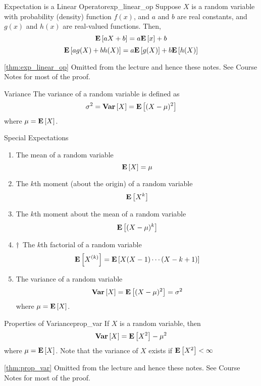 \begin{Theorem}{Expectation is a Linear Operator}{exp_linear_op}
    Suppose $ X $ is a random variable with probability (density)
    function $ f(x) $, and $ a $ and $ b $ are real constants,
    and $ g(x) $ and $ h(x) $ are real-valued functions. Then,
    \[ \bm{\mathrm{E}}\left[aX+b\right]=a\bm{\mathrm{E}}\left[x\right]+b \]
    \[ \bm{\mathrm{E}}\left[a g(X)+b h(X)\right]=a\bm{\mathrm{E}}\left[g(X)\right]+b\bm{\mathrm{E}}\left[h(X)\right] \]
\end{Theorem}
\begin{Proof}{\ref{thm:exp_linear_op}}{}
    Omitted from the lecture and hence these notes.
    See Course Notes for most of the proof.
\end{Proof}
\begin{Definition}{Variance}{}
    The variance of a random variable is defined as
    \[ \sigma^2=\bm{\mathrm{Var}}\left[X\right]=\bm{\mathrm{E}}\left[(X-\mu)^2\right] \]
    where $ \mu=\bm{\mathrm{E}}\left[X\right] $.
\end{Definition}
\begin{Definition}{Special Expectations}{}
    \begin{enumerate}[label=(\Roman*)]
        \item The mean of a random variable
              \[ \bm{\mathrm{E}}\left[X\right]=\mu \]
        \item The $ k $th moment (about the origin) of a random variable
              \[ \bm{\mathrm{E}}\left[X^k\right] \]
        \item The $ k $th moment about the mean of a random variable
              \[ \bm{\mathrm{E}}\left[(X-\mu)^k\right] \]
        \item $ \dagger $~The $ k $th factorial of a random variable
              \[ \bm{\mathrm{E}}\left[X^{(k)}\right]=\bm{\mathrm{E}}\left[X(X-1)\cdots(X-k+1)\right] \]
        \item The variance of a random variable
              \[ \bm{\mathrm{Var}}\left[X\right]=\bm{\mathrm{E}}\left[(X-\mu)^2\right]=\sigma^2 \]
              where $ \mu=\bm{\mathrm{E}}\left[X\right] $.
    \end{enumerate}
\end{Definition}
\begin{Theorem}{Properties of Variance}{prop_var}
    If $ X $ is a random variable, then
    \[ \bm{\mathrm{Var}}\left[X\right]=\bm{\mathrm{E}}\left[X^2\right]-\mu^2 \]
    where $ \mu=\bm{\mathrm{E}}\left[X\right] $. Note that the
    variance of $ X $ exists if $ \bm{\mathrm{E}}\left[X^2\right]<\infty $
\end{Theorem}
\begin{Proof}{\ref{thm:prop_var}}{}
    Omitted from the lecture and hence these notes.
    See Course Notes for most of the proof.
\end{Proof}

